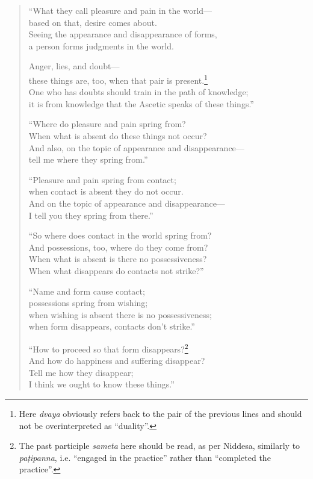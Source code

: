 \documentclass[12pt,openany]{book}%
\begin{document}
\begin{verse}
“What they call pleasure and pain in the world—\\
based on that, desire comes about. \\
Seeing the appearance and disappearance of forms, \\
a person forms judgments in the world. 

Anger, lies, and doubt—\\
these things are, too, when that pair is present.\footnote{Here \textit{dvaya} obviously refers back to the pair of the previous lines and should not be overinterpreted as “duality”. } \\
One who has doubts should train in the path of knowledge; \\
it is from knowledge that the Ascetic speaks of these things.” 

“Where do pleasure and pain spring from? \\
When what is absent do these things not occur? \\
And also, on the topic of appearance and disappearance—\\
tell me where they spring from.” 

“Pleasure and pain spring from contact; \\
when contact is absent they do not occur. \\
And on the topic of appearance and disappearance—\\
I tell you they spring from there.” 

“So where does contact in the world spring from? \\
And possessions, too, where do they come from? \\
When what is absent is there no possessiveness? \\
When what disappears do contacts not strike?” 

“Name and form cause contact; \\
possessions spring from wishing; \\
when wishing is absent there is no possessiveness; \\
when form disappears, contacts don’t strike.” 

“How to proceed so that form disappears?\footnote{The past participle \textit{sameta} here should be read, as per Niddesa, similarly to \textit{\textsanskrit{paṭipanna}}, i.e. “engaged in the practice” rather than “completed the practice”. } \\
And how do happiness and suffering disappear? \\
Tell me how they disappear; \\
I think we ought to know these things.” 


\end{verse}
\end{document}
